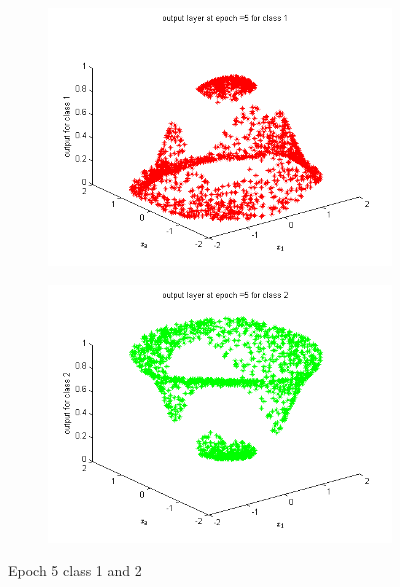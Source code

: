 \documentclass{article}
\begin{document}
\begin{figure}
\begin{subfigure}{.5\textwidth}
  \centering
  \includegraphics[width=.8\linewidth]{Classification/nonlinearlySeparable/5_1}
 
\end{subfigure}%
\begin{subfigure}{.5\textwidth}
  \centering
  \includegraphics[width=.8\linewidth]{Classification/nonlinearlySeparable/5_2}
  
\end{subfigure}
\caption{Epoch 5 class 1 and 2}
\end{figure}
\end{document}
